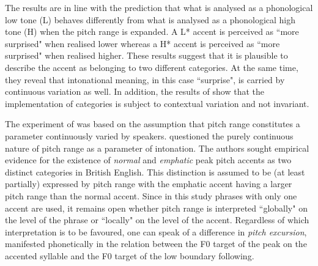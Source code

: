 The results are in line with the prediction that what is analysed as a phonological low tone (L) behaves differently from what is analysed as a phonological high tone (H) when the pitch range is expanded. A L* accent is perceived as ``more surprised" when realised lower whereas a H* accent is perceived as ``more surprised" when realised higher. These results suggest that it is plausible to describe the accent as belonging to two different categories. At the same time, they reveal that intonational meaning, in this case ``surprise", is carried by continuous variation as well. In addition, the results of \citet{GussenhovenRietveld2000} show that the implementation of categories is subject to contextual variation and not invariant.

The experiment of \citet{GussenhovenRietveld2000} was based on the assumption that pitch range constitutes a parameter continuously varied by speakers. \citet{LaddMorton1997} questioned the purely continuous nature of pitch range as a parameter of intonation. The authors sought empirical evidence for the existence of \emph{normal} and \emph{emphatic} peak pitch accents as two distinct categories in British English. This distinction is assumed to be (at least partially) expressed by pitch range with the emphatic accent having a larger pitch range than the normal accent. Since in this study phrases with only one accent are used, it remains open whether pitch range is interpreted ``globally" on the level of the phrase or ``locally" on the level of the accent. Regardless of which interpretation is to be favoured, one can speak of a difference in \emph{pitch excursion}, manifested phonetically in the relation between the F0 target of the peak on the accented syllable and the F0 target of the low boundary following.


